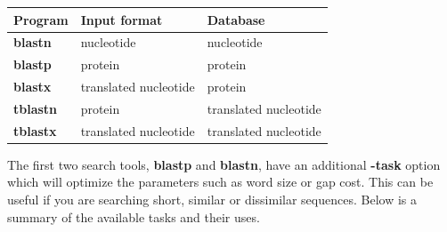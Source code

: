 \documentclass[11pt]{article}
\begin{document}
\begin{longtable}[]{@{}lll@{}}
\hline
\textbf{Program} & \textbf{Input format} &
\textbf{Database}\tabularnewline
\hline
\endhead
\textbf{blastn} & nucleotide & nucleotide\tabularnewline
\textbf{blastp} & protein & protein\tabularnewline
\textbf{blastx} & translated nucleotide & protein\tabularnewline
\textbf{tblastn} & protein & translated nucleotide\tabularnewline
\textbf{tblastx} & translated nucleotide & translated
nucleotide\tabularnewline
\hline
\end{longtable}

The first two search tools, \textbf{blastp} and \textbf{blastn}, have an
additional \textbf{-task} option which will optimize the parameters such
as word size or gap cost. This can be useful if you are searching short,
similar or dissimilar sequences. Below is a summary of the available
tasks and their uses.
\end{document}
